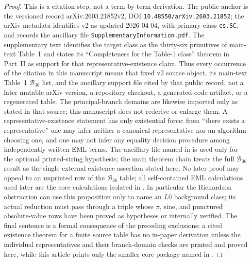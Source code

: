 \begin{proof}
This is a citation step, not a term-by-term derivation.  The public anchor is the
versioned record arXiv:2603.21852v2, DOI
\texttt{10.48550/arXiv.2603.21852}; the arXiv metadata identifies v2 as updated
2026-04-04, with primary class \texttt{cs.SC}, and records the ancillary file
\texttt{SupplementaryInformation.pdf}.  The supplementary text identifies the
target class as the thirty-six primitives of main-text Table~1 and states its
``Completeness for the Table-1 class'' theorem in Part~II as support for that
representative-existence claim.  Thus every occurrence of the citation in this
manuscript means that fixed v2 source object, its main-text Table~1
\(\mathcal B_{36}\) list, and the ancillary support file cited by that public
record, not a later mutable arXiv version, a repository checkout, a
generated-code artifact, or a regenerated table.  The principal-branch domains are likewise imported only
as stated in that source; this manuscript does not rederive or enlarge them.  A
representative-existence statement has only
existential force: from
``there exists a representative'' one may infer neither a canonical
representative nor an algorithm choosing one, and one may not infer any equality
decision procedure among independently written EML terms.  The ancillary file
named in  is used only for the optional printed-string hypothesis;
the main theorem chain treats the full \(\mathcal B_{36}\) result as the single
external existence assertion stated here.  No later proof may appeal to an
unprinted row of the \(\mathcal B_{36}\) table; all self-contained EML
calculations used later are the core calculations isolated in
.  In particular the Richardson
obstruction can use this proposition only to name an \(L0\) background class; its
actual reduction must pass through a triple whose \(\pi\), sine, and punctured
absolute-value rows have been proved as hypotheses or internally verified.
The final sentence is a formal consequence of the preceding exclusions: a cited
existence theorem for a finite source table has no in-paper derivation unless the
individual representatives and their branch-domain checks are printed and proved
here, while this article prints only the smaller core package named in
.
\end{proof}


